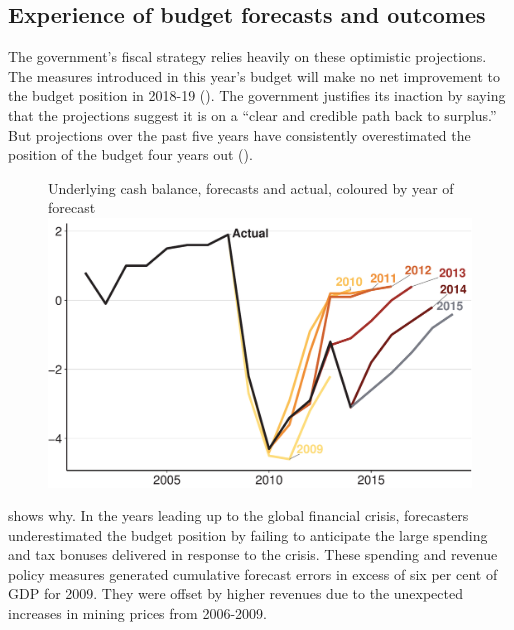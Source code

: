 \documentclass[twoside,english]{grattanBudgetRepairb5portrait}
\begin{document}
\subsection{Experience of budget forecasts and outcomes}\label{subsubsec:3-3-3}
The government’s fiscal strategy relies heavily on these optimistic projections. The measures introduced in this year’s budget will make no net improvement to the budget position in 2018-19 (). The government justifies its inaction by saying that the projections suggest it is on a “clear and credible path back to surplus.”  But projections over the past five years have consistently overestimated the position of the budget four years out (). 
\begin{figure}
%
{Underlying cash balance, forecasts and actual, coloured by year of forecast}
\includegraphics[width=\columnwidth]{Fiscal-challenges/figure/Figure9a-1.pdf}
\end{figure}

 shows why. In the years leading up to the global financial crisis, forecasters underestimated the budget position by failing to anticipate the large spending and tax bonuses delivered in response to the crisis. These spending and revenue policy measures generated cumulative forecast errors in excess of six per cent of GDP for 2009.  They were offset by higher revenues due to the unexpected increases in mining prices from 2006-2009.
\end{document}
